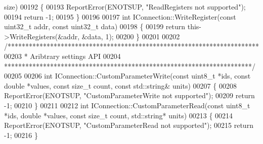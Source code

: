 \begin{DoxyCode}
      size)
00192 \{
00193     ReportError(ENOTSUP, \textcolor{stringliteral}{"ReadRegisters not supported"});
00194     \textcolor{keywordflow}{return} -1;
00195 \}
00196 
00197 \textcolor{keywordtype}{int} IConnection::WriteRegister(\textcolor{keyword}{const} uint32\_t addr, \textcolor{keyword}{const} uint32\_t data)
00198 \{
00199     \textcolor{keywordflow}{return} this->WriteRegisters(&addr, &data, 1);
00200 \}
00201 
00202 \textcolor{comment}{/***********************************************************************}
00203 \textcolor{comment}{ * Aribtrary settings API}
00204 \textcolor{comment}{ **********************************************************************/}
00205 
00206 \textcolor{keywordtype}{int} IConnection::CustomParameterWrite(\textcolor{keyword}{const} uint8\_t *ids, \textcolor{keyword}{const} \textcolor{keywordtype}{double} *values, \textcolor{keyword}{const} \textcolor{keywordtype}{size\_t} 
      count, \textcolor{keyword}{const} std::string& units)
00207 \{
00208     ReportError(ENOTSUP, \textcolor{stringliteral}{"CustomParameterWrite not supported"});
00209     \textcolor{keywordflow}{return} -1;
00210 \}
00211 
00212 \textcolor{keywordtype}{int} IConnection::CustomParameterRead(\textcolor{keyword}{const} uint8\_t *ids, \textcolor{keywordtype}{double} *values, \textcolor{keyword}{const} \textcolor{keywordtype}{size\_t} 
      count, std::string* units)
00213 \{
00214     ReportError(ENOTSUP, \textcolor{stringliteral}{"CustomParameterRead not supported"});
00215     \textcolor{keywordflow}{return} -1;
00216 \}
\end{DoxyCode}

